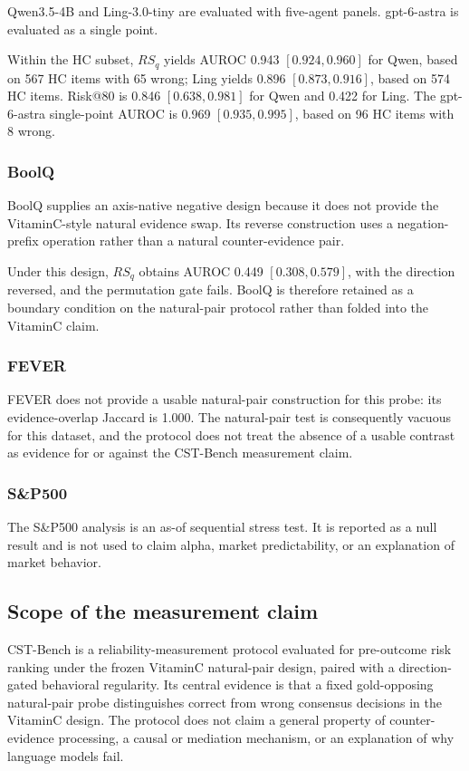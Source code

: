 \documentclass[11pt]{article}
\begin{document}
Qwen3.5-4B and Ling-3.0-tiny are evaluated with five-agent panels. gpt-6-astra is evaluated as a single point.

Within the HC subset, \(RS_q\) yields AUROC 0.943 \([0.924,0.960]\) for Qwen, based on 567 HC items with 65 wrong; Ling yields 0.896 \([0.873,0.916]\), based on 574 HC items. Risk@80 is 0.846 \([0.638,0.981]\) for Qwen and 0.422 for Ling. The gpt-6-astra single-point AUROC is 0.969 \([0.935,0.995]\), based on 96 HC items with 8 wrong.

\subsubsection{BoolQ}

BoolQ supplies an axis-native negative design because it does not provide the VitaminC-style natural evidence swap. Its reverse construction uses a negation-prefix operation rather than a natural counter-evidence pair.

Under this design, \(RS_q\) obtains AUROC 0.449 \([0.308,0.579]\), with the direction reversed, and the permutation gate fails. BoolQ is therefore retained as a boundary condition on the natural-pair protocol rather than folded into the VitaminC claim.

\subsubsection{FEVER}

FEVER does not provide a usable natural-pair construction for this probe: its evidence-overlap Jaccard is 1.000. The natural-pair test is consequently vacuous for this dataset, and the protocol does not treat the absence of a usable contrast as evidence for or against the CST-Bench measurement claim.

\subsubsection{S\&P500}

The S\&P500 analysis is an as-of sequential stress test. It is reported as a null result and is not used to claim alpha, market predictability, or an explanation of market behavior.

\subsection{Scope of the measurement claim}

CST-Bench is a reliability-measurement protocol evaluated for pre-outcome risk ranking under the frozen VitaminC natural-pair design, paired with a direction-gated behavioral regularity. Its central evidence is that a fixed gold-opposing natural-pair probe distinguishes correct from wrong consensus decisions in the VitaminC design. The protocol does not claim a general property of counter-evidence processing, a causal or mediation mechanism, or an explanation of why language models fail.
\end{document}
